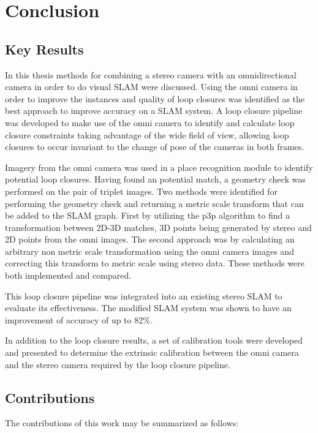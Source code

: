 \chapter{Conclusion}
\label{chapter:conclusion}

\section{Key Results}

In this thesis methods for combining a stereo camera with an omnidirectional camera in order to do visual SLAM were discussed.  Using the omni camera in order to improve the instances and quality of loop closures was identified as the best approach to improve accuracy on a SLAM system.  A loop closure pipeline was developed to make use of the omni camera to identify and calculate loop closure constraints taking advantage of the wide field of view, allowing loop closures to occur invariant to the change of pose of the cameras in both frames.

Imagery from the omni camera was used in a place recognition module to identify potential loop closures.  Having found an potential match, a geometry check was performed on the pair of triplet images.  Two methods were identified for performing the geometry check and returning a metric scale transform that can be added to the SLAM graph. First by utilizing the p3p algorithm to find a transformation between 2D-3D matches, 3D points being generated by stereo and 2D points from the omni images.  The second approach was by calculating an arbitrary non metric scale transformation using the omni camera images and correcting this transform to metric scale using stereo data.  These methods were both implemented and compared.

This loop closure pipeline was integrated into an existing stereo SLAM to evaluate its effectiveness. The modified SLAM system was shown to have an improvement of accuracy of up to 82\%.

In addition to the loop closure results, a set of calibration tools were developed and presented to determine the extrinsic calibration between the omni camera and the stereo camera required by the loop closure pipeline.

\section{Contributions}

The contributions of this work may be summarized as follows:

